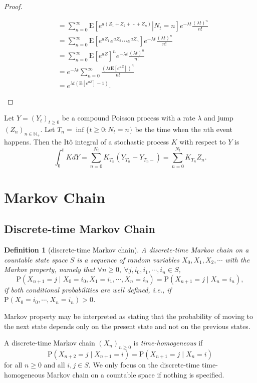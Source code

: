 \documentclass{article}
\newtheorem{definition}{Definition}[section]
\theoremstyle{nonumberplain}
\newtheorem{proof}{Proof.}
\begin{document}
\begin{proof}
\begin{enumerate}
\[\begin{aligned}
	&=\sum_{n=0}^{\infty}\mathrm{E}\left[\left.e^{a\left(Z_1+Z_2+\cdots+Z_{n}\right)}\right|N_t=n\right]e^{-\lambda t}\frac{\left(\lambda t\right)^n}{n!}\\
	&=\sum_{n=0}^{\infty}\mathrm{E}\left[e^{aZ_1}e^{aZ_2}\cdots e^{aZ_{n}}\right]e^{-\lambda t}\frac{\left(\lambda t\right)^n}{n!}\\
	&=\sum_{n=0}^{\infty}\mathrm{E}\left[e^{aZ}\right]^ne^{-\lambda t}\frac{\left(\lambda t\right)^n}{n!}\\
	&=e^{-\lambda t}\sum_{n=0}^{\infty}\frac{\left(\lambda t\mathrm{E}\left[e^{aZ}\right]\right)^n}{n!}\\
	&=e^{\lambda t\left(\mathrm{E}\left[e^{aZ}\right]-1\right)}.
 	\end{aligned}
 	\]
\end{enumerate}
\end{proof}
Let $Y=(Y_t)_{t\ge 0}$ be a compound Poisson process with a rate $\lambda$ and jump $(Z_n)_{n\in \mathbb{N}_+}$. Let $T_n=\inf\{t\ge0:N_t= n\}$ be the time when the $n$th event happens. Then the Itô integral of a stochastic process $K$ with respect to $Y$ is
\[
\int_{0}^{t}KdY=\sum_{n=0}^{N_t}K_{T_n}(Y_{T_n}-Y_{T_n-})=\sum_{n=0}^{N_t}K_{T_n}Z_n.
\]


\section{Markov Chain}
\subsection{Discrete-time Markov Chain}
\begin{definition}[discrete-time Markov chain]
	A \emph{discrete-time Markov chain} on a countable state space $S$ is a sequence of random variables $X_0, X_1, X_2,\cdots$ with the Markov property, namely that $\forall n\ge0,\ \forall j,i_0,i_1,\cdots,i_n\in S$,	
	\[
	\mathrm{P}(X_{n+1}=j\mid X_{0}=i_{0},X_{1}=i_{1},\cdots,X_{n}=i_{n})=\mathrm{P}(X_{n+1}=j\mid X_{n}=i_{n}), 
	\] if both conditional probabilities are well defined, i.e., if $ 	\mathrm{P}(X_{0}=i_{0},\cdots ,X_{n}=i_{n})>0$.
\end{definition}	
Markov property may be interpreted as stating that the probability of moving to the next state depends only on the present state and not on the previous states. 

\noindent A discrete-time Markov chain $(X_n)_{n\ge0}$ is \emph{time-homogeneous} if
\[
\mathrm{P}(X_{n+2}=j\mid X_{n+1}=i)=\mathrm{P}(X_{n+1}=j\mid X_{n}=i)
\]
for all $n\ge0$ and all $i,j\in S$. We only focus on the discrete-time time-homogeneous Markov chain on a countable space if nothing is specified. 
\end{document}
